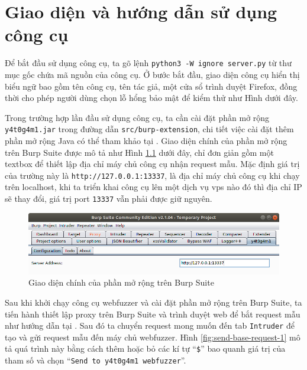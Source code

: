 \cleardoublepage

\appendix
\chapter{Giao diện và hướng dẫn sử dụng công cụ}
Để bắt đầu sử dụng công cụ, ta gõ lệnh \texttt{python3 -W ignore server.py} từ thư mục gốc chứa mã nguồn của công cụ. Ở bước bắt đầu, giao diện công cụ hiển thị biểu ngữ bao gồm tên công cụ, tên tác giả, một cửa sổ trình duyệt Firefox, đồng thời cho phép người dùng chọn lỗ hổng bảo mật để kiểm thử như Hình  dưới đây.

Trong trường hợp lần đầu sử dụng công cụ, ta cần cài đặt phần mở rộng \texttt{y4t0g4m1.jar} trong đường dẫn \texttt{src/burp-extension}, chi tiết việc cài đặt thêm phần mở rộng Java có thể tham khảo tại \parencite{burp-suite-extension-setup}. Giao diện chính của phần mở rộng trên Burp Suite được mô tả như Hình \ref{fig:main-burp-extension-interface} dưới đây, chỉ đơn giản gồm một textbox để thiết lập địa chỉ máy chủ công cụ nhận request mẫu. Mặc định giá trị của trường này là \texttt{http://127.0.0.1:13337}, là địa chỉ máy chủ công cụ khi chạy trên localhost, khi ta triển khai công cụ lên một dịch vụ vps nào đó thì địa chỉ IP sẽ thay đổi, giá trị port \texttt{13337} vẫn phải được giữ nguyên. 
\begin{figure}[H]
  \centering
    \includegraphics[width=\textwidth,keepaspectratio=true]{images/main-burp-extension-interface.png}
  \caption{Giao diện chính của phần mở rộng trên Burp Suite}
  \label{fig:main-burp-extension-interface}
\end{figure}
Sau khi khởi chạy công cụ webfuzzer và cài đặt phần mở rộng trên Burp Suite, ta tiến hành thiết lập proxy trên Burp Suite và trình duyệt web để bắt request mẫu như hướng dẫn tại \parencite{burp-suite-proxy}. Sau đó ta chuyển request mong muốn đến tab \texttt{Intruder} để tạo và gửi request mẫu đến máy chủ webfuzzer. Hình \ref{fig:send-base-request-1} mô tả quá trình này bằng cách thêm hoặc bỏ các kí tự ``\texttt{\$}'' bao quanh giá trị của tham số và chọn ``\texttt{Send to y4t0g4m1 webfuzzer}''.
